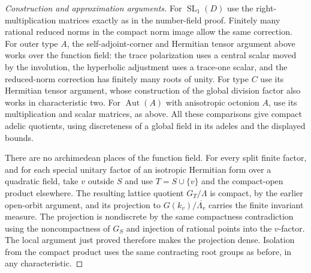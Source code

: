 \documentclass[11pt,a4paper,openany,oneside]{book}
\theoremstyle{resultstyle}
\theoremstyle{definition}
\numberwithin{equation}{chapter}
\begin{document}
\begin{proof}[Construction and approximation arguments]
For \(\operatorname{SL}_1(D)\) use the right-multiplication
matrices exactly as in the number-field proof. Finitely
many rational reduced norms in the compact norm image
allow the same correction. For outer type \(A\), the
self-adjoint-corner and Hermitian tensor argument above
works over the function field: the trace polarization
uses a central scalar moved by the involution, the
hyperbolic adjustment uses a trace-one scalar, and the
reduced-norm correction has finitely many roots of unity.
For type \(C\) use its Hermitian tensor argument, whose
construction of the global division factor also works
in characteristic two. For \(\operatorname{Aut}(A)\)
with anisotropic octonion \(A\), use its multiplication
and scalar matrices, as above. All these comparisons
give compact adelic quotients, using discreteness of a
global field in its adeles and the displayed bounds.

There are no archimedean places of the function field.
For every split finite factor, and for each special
unitary factor of an isotropic Hermitian form over a
quadratic field, take \(v\) outside \(S\) and use
\(T=S\cup\{v\}\) and the compact-open product elsewhere.
The resulting lattice quotient \(G_T/\Lambda\) is
compact, by the earlier open-orbit argument, and
its projection to \(G(k_v)/\overline{\Lambda_v}\)
carries the finite invariant measure. The projection
is nondiscrete by the same compactness contradiction
using the noncompactness of \(G_S\) and injection of
rational points into the \(v\)-factor. The local
argument just proved therefore makes the
projection dense. Isolation from the compact
product uses the same contracting root groups as
before, in any characteristic.


\end{proof}
\end{document}
